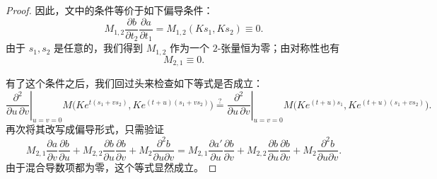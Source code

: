 \begin{proposition}[{\cite[Proposition~5.1]{Si1}}]
\begin{proof}
因此，文中的条件等价于如下偏导条件：
\[
M_{1,2}\frac{\partial b}{\partial t_2}\frac{\partial a}{\partial t_1}
=
M_{1,2}(Ks_1,Ks_2)\equiv 0.
\]
由于 \(s_1,s_2\) 是任意的，我们得到 \(M_{1,2}\) 作为一个 \(2\)-张量恒为零；由对称性也有
\[
M_{2,1}\equiv 0.
\]

有了这个条件之后，我们回过头来检查如下等式是否成立：
\[
\left.\frac{\partial^2}{\partial u\,\partial v}\right|_{u=v=0}
M\bigl(Ke^{t(s_1+vs_2)},Ke^{(t+u)(s_1+vs_2)}\bigr)
\stackrel{?}{=}
\left.\frac{\partial^2}{\partial u\,\partial v}\right|_{u=v=0}
M\bigl(Ke^{(t+u)s_1},Ke^{(t+u)(s_1+vs_2)}\bigr).
\]
再次将其改写成偏导形式，只需验证
\[
M_{2,1}\frac{\partial a}{\partial v}\frac{\partial b}{\partial u}
+
M_{2,2}\frac{\partial b}{\partial u}\frac{\partial b}{\partial v}
+
M_2\frac{\partial^2 b}{\partial u\partial v}
=
M_{2,1}\frac{\partial a'}{\partial u}\frac{\partial b}{\partial v}
+
M_{2,2}\frac{\partial b}{\partial u}\frac{\partial b}{\partial v}
+
M_2\frac{\partial^2 b}{\partial u\partial v}.
\]
由于混合导数项都为零，这个等式显然成立。
\end{proof}
\end{proposition}

